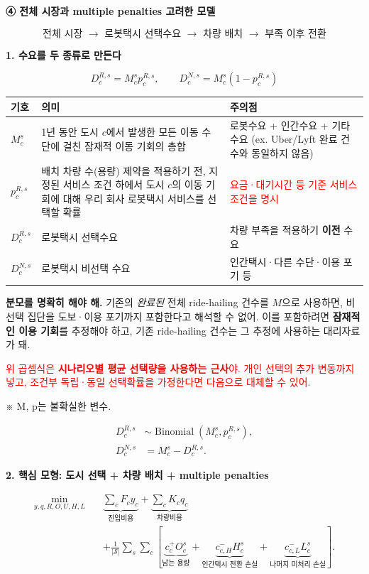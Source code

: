 \documentclass[11pt,a4paper]{article}
\newcommand{\blocktitle}[1]{\par\bigskip\noindent\textbf{\large #1}\par\smallskip}
\begin{document}
\blocktitle{④ 전체 시장과 multiple penalties 고려한 모델}

\[
\textbf{전체 시장 \(\rightarrow\) 로봇택시 선택수요 \(\rightarrow\) 차량 배치 \(\rightarrow\) 부족 이후 전환}
\]

\blocktitle{1. 수요를 두 종류로 만든다}

\[
D_c^{R,s}=M_c^s p_c^{R,s},
\qquad
D_c^{N,s}=M_c^s(1-p_c^{R,s})
\]

\begin{longtable}{@{}P{0.14\textwidth}P{0.41\textwidth}P{0.37\textwidth}@{}}
\toprule
기호 & 의미 & 주의점 \\
\midrule
\endhead
$M_c^s$ & 1년 동안 도시 $c$에서 발생한 모든 이동 수단에 걸친 잠재적 이동 기회의 총합 & 로봇수요 + 인간수요 + 기타수요 (ex. Uber/Lyft 완료 건수와 동일하지 않음) \\
$p_c^{R,s}$ & 배치 차량 수(용량) 제약을 적용하기 전, 지정된 서비스 조건 하에서 도시 $c$의 이동 기회에 대해 우리 회사 로봇택시 서비스를 선택할 확률 & \textcolor{red}{요금·대기시간 등 기준 서비스 조건을 명시} \\
$D_c^{R,s}$ & 로봇택시 선택수요 & 차량 부족을 적용하기 \textbf{이전} 수요 \\
$D_c^{N,s}$ & 로봇택시 비선택 수요 & 인간택시·다른 수단·이용 포기 등 \\
\bottomrule
\end{longtable}

\textbf{분모를 명확히 해야 해.} 기존의 \emph{완료된} 전체 ride-hailing 건수를 $M$으로 사용하면, 비선택 집단을 도보·이용 포기까지 포함한다고 해석할 수 없어. 이를 포함하려면 \textbf{잠재적인 이용 기회}를 추정해야 하고, 기존 ride-hailing 건수는 그 추정에 사용하는 대리자료가 돼.

\textcolor{red}{위 곱셈식은 \textbf{시나리오별 평균 선택량을 사용하는 근사}야. 개인 선택의 추가 변동까지 넣고, 조건부 독립·동일 선택확률을 가정한다면 다음으로 대체할 수 있어.}

※ M, p는 불확실한 변수.

{\color{red}\[\begin{aligned}
D_c^{R,s}&\sim\operatorname{Binomial}(M_c^s,p_c^{R,s}),\\
D_c^{N,s}&=M_c^s-D_c^{R,s}.
\end{aligned}
\]}

\blocktitle{2. 핵심 모형: 도시 선택 + 차량 배치 + multiple penalties}

\[
\boxed{
\begin{aligned}
\min_{y,q,R,O,U,H,L}\quad
&\underbrace{\sum_c F_cy_c}_{\text{진입비용}}
+\underbrace{\sum_c K_cq_c}_{\text{차량비용}}\\
&+\frac1{|\mathcal S|}\sum_s\sum_c
\left[
\underbrace{c_c^+O_c^s}_{\text{남는 용량}}
+\underbrace{c_{c,H}^-H_c^s}_{\text{인간택시 전환 손실}}
+\underbrace{c_{c,L}^-L_c^s}_{\text{나머지 미처리 손실}}
\right].
\end{aligned}
}
\]
\end{document}
